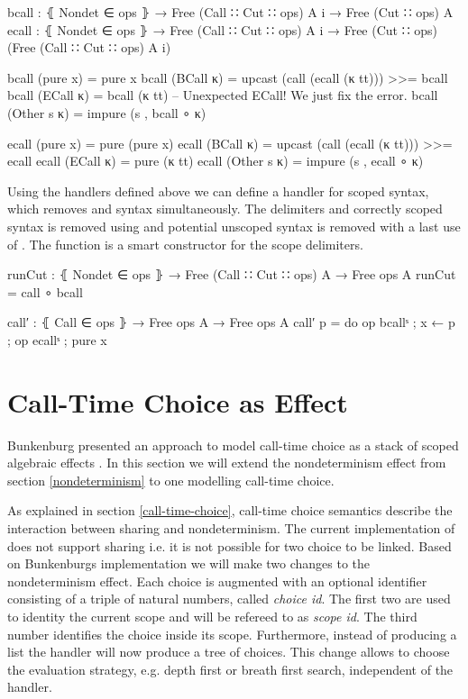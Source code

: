 \begin{code}
bcall : ⦃ Nondet ∈ ops ⦄ → Free (Call ∷ Cut ∷ ops) A {i} → Free (Cut ∷ ops) A
ecall : ⦃ Nondet ∈ ops ⦄ → Free (Call ∷ Cut ∷ ops) A {i}
  → Free (Cut ∷ ops) (Free (Call ∷ Cut ∷ ops) A {i})

bcall (pure x)     = pure x
bcall (BCall κ)    = upcast (call (ecall (κ tt))) >>= bcall
bcall (ECall κ)    = bcall (κ tt) -- Unexpected ECall! We just fix the error.
bcall (Other s κ)  = impure (s , bcall ∘ κ)

ecall (pure x)     = pure (pure x)
ecall (BCall κ)    = upcast (call (ecall (κ tt))) >>= ecall
ecall (ECall κ)    = pure (κ tt)
ecall (Other s κ)  = impure (s , ecall ∘ κ)
\end{code}
Using the handlers defined above we can define a handler for scoped
 syntax, which removes  and
 syntax simultaneously.
The delimiters and correctly scoped  syntax is removed using
 and potential unscoped  syntax is
removed with a last use of .
The function  is a smart constructor for the scope
delimiters.

\begin{code}
runCut : ⦃ Nondet ∈ ops ⦄ → Free (Call ∷ Cut ∷ ops) A → Free ops A
runCut = call ∘ bcall

call′ : ⦃ Call ∈ ops ⦄ → Free ops A → Free ops A
call′ p = do op bcallˢ ; x ← p ; op ecallˢ ; pure x
\end{code}

\section{Call-Time Choice as Effect}

Bunkenburg presented an approach to model call-time choice as a stack of
scoped algebraic effects \cite{bunkenburg2019modeling}.
In this section we will extend the nondeterminism effect from section
\ref{nondeterminism} to one modelling call-time choice.

As explained in section \ref{call-time-choice}, call-time choice semantics
describe the interaction between sharing and nondeterminism.
The current implementation of  does not support sharing
i.e. it is not possible for two choice to be linked.
Based on Bunkenburgs implementation we will make two changes to the
nondeterminism effect.
Each choice is augmented with an optional identifier consisting of a triple of
natural numbers, called \textit{choice id}.
The first two are used to identity the current scope and will be refereed to as
\textit{scope id}.
The third number identifies the choice inside its scope.
Furthermore, instead of producing a list the handler will now produce a tree of
choices.
This change allows to choose the evaluation strategy, e.g. depth first or breath
first search, independent of the handler.


